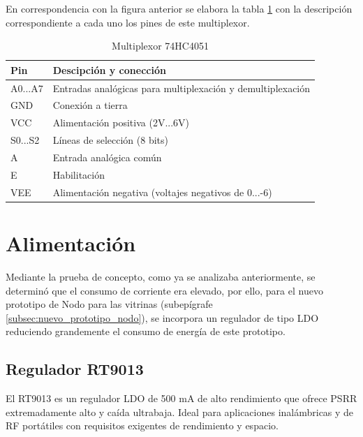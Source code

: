En correspondencia con la figura anterior se elabora la tabla \ref{tab:pines_74HC4051} con la descripción correspondiente a cada uno los pines de este multiplexor.

\begin{table}[H]
    \centering
    \caption{Multiplexor 74HC4051}
    \label{tab:pines_74HC4051}
    \begin{tabular}{|l|l|}
    \hline
    \rowcolor[HTML]{9698ED} 
    Pin     & Descipción y conección                                            \\ \hline
    A0...A7 & Entradas analógicas para multiplexación y demultiplexación        \\ \hline
    GND     & Conexión a tierra                                                 \\ \hline
    VCC     & Alimentación positiva (2V...6V)                                   \\ \hline
    S0...S2 & Líneas de selección (8 bits)                                      \\ \hline
    A       & Entrada analógica común                                           \\ \hline
    E       & Habilitación                                                      \\ \hline
    VEE     & Alimentación negativa (voltajes negativos de 0...-6)              \\ \hline
    \end{tabular}
\end{table}



\section{Alimentación}

Mediante la prueba de concepto, como ya se analizaba anteriormente, se determinó que el consumo de corriente era elevado, por ello, para el nuevo prototipo de Nodo para las vitrinas (subepígrafe \ref{subsec:nuevo_prototipo_nodo}), se 
incorpora un regulador de tipo LDO reduciendo grandemente el consumo de energía de este prototipo.

\subsection{Regulador RT9013}

El RT9013 es un regulador LDO de 500 mA de alto rendimiento que ofrece PSRR extremadamente alto y caída ultrabaja. Ideal para aplicaciones inalámbricas y de RF portátiles con requisitos exigentes de rendimiento y espacio.

